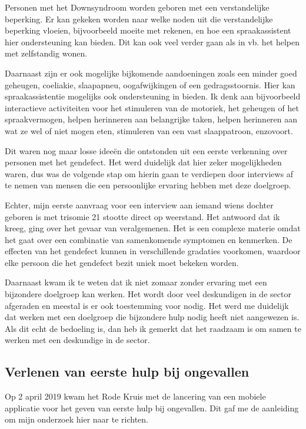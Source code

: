 Personen met het Downsyndroom worden geboren met een verstandelijke beperking. Er kan gekeken worden naar welke noden uit die verstandelijke beperking vloeien, bijvoorbeeld moeite met rekenen, en hoe een spraakassistent hier ondersteuning kan bieden. Dit kan ook veel verder gaan als in vb. het helpen met zelfstandig wonen.

Daarnaast zijn er ook mogelijke bijkomende aandoeningen zoals een minder goed geheugen, coeliakie, slaapapneu, oogafwijkingen of een gedragsstoornis. Hier kan spraakassistentie mogelijks ook ondersteuning in bieden. Ik denk aan bijvoorbeeld interactieve activiteiten voor het stimuleren van de motoriek, het geheugen of het spraakvermogen, helpen herinneren aan belangrijke taken, helpen herinneren aan wat ze wel of niet mogen eten, stimuleren van een vast slaappatroon, enzovoort. \autocite{volksgezondheidenzorg2019}

Dit waren nog maar losse ideeën die ontstonden uit een eerste verkenning over personen met het gendefect. Het werd duidelijk dat hier zeker mogelijkheden waren, dus was de volgende stap om hierin gaan te verdiepen door interviews af te nemen van mensen die een persoonlijke ervaring hebben met deze doelgroep.

Echter, mijn eerste aanvraag voor een interview aan iemand wiens dochter geboren is met trisomie 21 stootte direct op weerstand. Het antwoord dat ik kreeg, ging over het gevaar van veralgemenen. Het is een complexe materie omdat het gaat over een combinatie van samenkomende symptomen en kenmerken. De effecten van het gendefect kunnen in verschillende gradaties voorkomen, waardoor elke persoon die het gendefect bezit uniek moet bekeken worden.

Daarnaast kwam ik te weten dat ik niet zomaar zonder ervaring met een bijzondere doelgroep kan werken. Het wordt door veel deskundigen in de sector afgeraden en meestal is er ook toestemming voor nodig.
Het werd me duidelijk dat werken met een doelgroep die bijzondere hulp nodig heeft niet aangewezen is. Als dit echt de bedoeling is, dan heb ik gemerkt dat het raadzaam is om samen te werken met een deskundige in de sector.

\subsection{Verlenen van eerste hulp bij ongevallen}
Op 2 april 2019 kwam het Rode Kruis met de lancering van een mobiele applicatie voor het geven van eerste hulp bij ongevallen. Dit gaf me de aanleiding om mijn onderzoek hier naar te richten.

